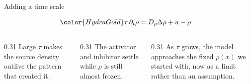 \begin{frame}{Adding a time scale}

  \vspace{-0.10cm}

  \begin{center}
    {\color{HydraWhite}\fontsize{11.4}{14.4}\selectfont
    \begin{align*}
      {\color{HydraGold}\tau}\,\partial_t\rho
      &=
      D_{\rho}\Delta\rho
      +
      u
      -
      \rho
    \end{align*}
    }
  \end{center}

  \vspace{0.16cm}

  \begin{columns}[T,onlytextwidth]

    \begin{column}{0.31\textwidth}
        {Large $\tau$ makes the source density outlive the pattern that
         created it.}
    \end{column}

    \begin{column}{0.31\textwidth}
        {The activator and inhibitor settle while $\rho$ is still almost
         frozen.}
    \end{column}

    \begin{column}{0.31\textwidth}
        {As $\tau$ grows, the model approaches the fixed $\rho(x)$ we started
         with, now as a limit rather than an assumption.}
    \end{column}

  \end{columns}

  \vspace{0.28cm}


\end{frame}


